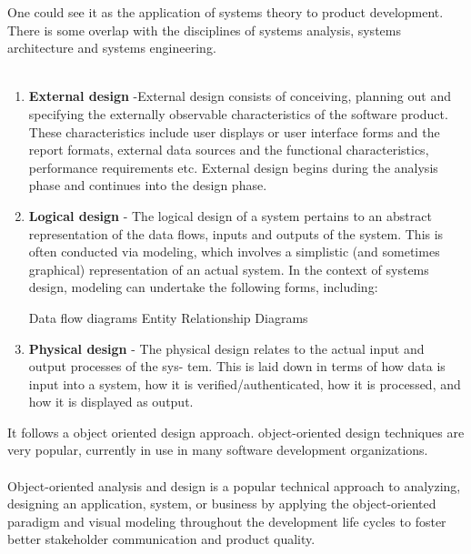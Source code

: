 One could see it as the application of systems theory to product development. There is
some overlap with the disciplines of systems analysis, systems architecture and systems
engineering.\\\\
\begin{enumerate}
\item {\textbf{External design}} -External design consists of conceiving, planning out and specifying the externally
observable characteristics of the software product. These characteristics include
user displays or user interface forms and the report formats, external data sources
and the functional characteristics, performance requirements etc. External design
begins during the analysis phase and continues into the design phase.
\item {\textbf{Logical design}} - The logical design of a system pertains to an abstract representation of the data
flows, inputs and outputs of the system. This is often conducted via modeling,
which involves a simplistic (and sometimes graphical) representation of an actual
system. In the context of systems design, modeling can undertake the following
forms, including:
\begin{itemize}
Data flow diagrams
Entity Relationship Diagrams
\end{itemize}
\item {\textbf{Physical design}} - The physical design relates to the actual input and output processes of the sys-
tem. This is laid down in terms of how data is input into a system, how it is
verified/authenticated, how it is processed, and how it is displayed as output.
\end{enumerate}
It follows a object oriented design approach. object-oriented design techniques are
very popular, currently in use in many software development organizations.\\\\
Object-oriented analysis and design is a popular technical approach to analyzing, designing an application, system, or business by applying the object-oriented paradigm and visual modeling throughout the development life cycles to foster better stakeholder communication and product quality.\\\\

